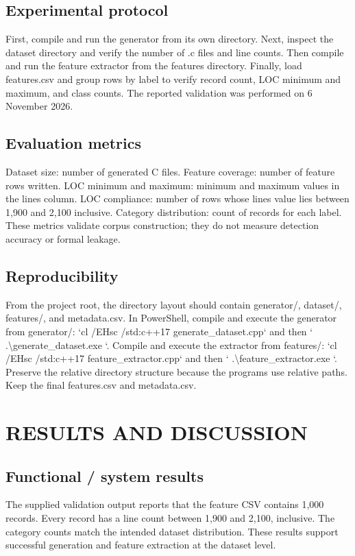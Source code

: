 \documentclass[12pt,a4paper,oneside]{report}
\begin{document}
\section{Experimental protocol}
First, compile and run the generator from its own directory. Next, inspect the dataset directory and verify the number of .c files and line counts. Then compile and run the feature extractor from the features directory. Finally, load features.csv and group rows by label to verify record count, LOC minimum and maximum, and class counts. The reported validation was performed on 6 November 2026.\par

\section{Evaluation metrics}
Dataset size: number of generated C files. Feature coverage: number of feature rows written. LOC minimum and maximum: minimum and maximum values in the lines column. LOC compliance: number of rows whose lines value lies between 1,900 and 2,100 inclusive. Category distribution: count of records for each label. These metrics validate corpus construction; they do not measure detection accuracy or formal leakage.\par

\section{Reproducibility}
From the project root, the directory layout should contain generator/, dataset/, features/, and metadata.csv. In PowerShell, compile and execute the generator from generator/: `cl /EHsc /std:c++17 generate\_dataset.cpp` and then ` .\textbackslash{}generate\_dataset.exe `. Compile and execute the extractor from features/: `cl /EHsc /std:c++17 feature\_extractor.cpp` and then ` .\textbackslash{}feature\_extractor.exe `. Preserve the relative directory structure because the programs use relative paths. Keep the final features.csv and metadata.csv.\par

\chapter{RESULTS AND DISCUSSION}

\section{Functional / system results}
The supplied validation output reports that the feature CSV contains 1,000 records. Every record has a line count between 1,900 and 2,100, inclusive. The category counts match the intended dataset distribution. These results support successful generation and feature extraction at the dataset level.\par
\end{document}
